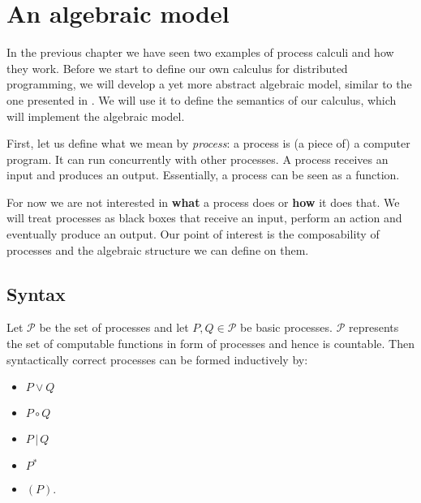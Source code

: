 \chapter{An algebraic model}
\label{chp:algebraic_model}
In the previous chapter we have seen two examples of process calculi and how they work. Before we start to define our own calculus for distributed programming, we will develop a yet more abstract algebraic model, similar to the one presented in \cite{Hoare:2012:LPU:2368298.2368301}. We will use it to define the semantics of our calculus, which will implement the algebraic model.

First, let us define what we mean by \textit{process}: a process is (a piece of) a computer program. It can run concurrently with other processes. A process receives an input and produces an output. Essentially, a process can be seen as a function. %

For now we are not interested in \textbf{what} a process does or \textbf{how} it does that. We will treat processes as black boxes that receive an input, perform an action and eventually produce an output. Our point of interest is the composability of processes and the algebraic structure we can define on them.

\section{Syntax}
\label{chp:syntax}
Let $\mathcal{P}$ be the set of processes and let $P, Q \in \mathcal{P}$ be basic processes. $\mathcal{P}$ represents the set of computable functions in form of processes and hence is countable. Then syntactically correct processes can be formed inductively by:
\begin{itemize}
  \item $P \vee Q$
  \vspace*{-0.25em}
  \item $P \circ Q$
  \vspace*{-0.25em}
  \item $P \,|\, Q$
  \vspace*{-0.25em}
  \item $P^*$
  \vspace*{-0.25em}
  \item $\left( P \right)$.
\end{itemize}

